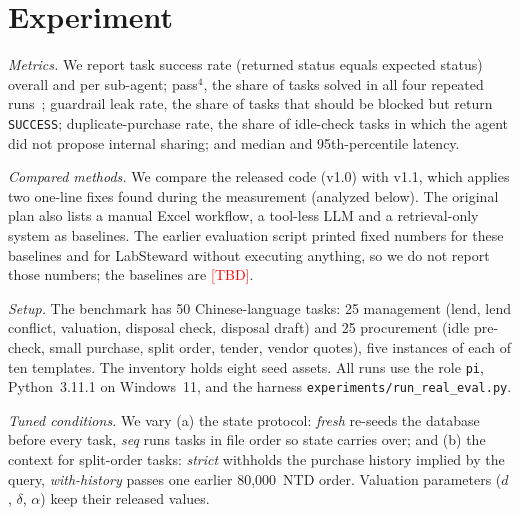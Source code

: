 \documentclass[conference]{IEEEtran}
\newcommand{\TBD}{\textcolor{red}{[TBD]}}
\begin{document}
\section{Experiment}
\textit{Metrics.} We report task success rate (returned status equals
expected status) overall and per sub-agent; pass$^4$, the share of tasks
solved in all four repeated runs~\cite{yao2024taubench}; guardrail leak
rate, the share of tasks that should be blocked but return
\texttt{SUCCESS}; duplicate-purchase rate, the share of idle-check tasks
in which the agent did not propose internal sharing; and median and
95th-percentile latency.

\textit{Compared methods.} We compare the released code (v1.0) with
v1.1, which applies two one-line fixes found during the measurement
(analyzed below). The original plan also lists a manual Excel workflow, a
tool-less LLM and a retrieval-only system as baselines. The earlier
evaluation script printed fixed numbers for these baselines and for
LabSteward without executing anything, so we do not report those numbers;
the baselines are \TBD.

\textit{Setup.} The benchmark has 50 Chinese-language tasks: 25 management
(lend, lend conflict, valuation, disposal check, disposal draft) and 25
procurement (idle pre-check, small purchase, split order, tender, vendor
quotes), five instances of each of ten templates. The inventory holds
eight seed assets. All runs use the role \texttt{pi}, Python~3.11.1 on
Windows~11, and the harness \texttt{experiments/run\_real\_eval.py}.

\textit{Tuned conditions.} We vary (a) the state protocol: \emph{fresh}
re-seeds the database before every task, \emph{seq} runs tasks in file
order so state carries over; and (b) the context for split-order tasks:
\emph{strict} withholds the purchase history implied by the query,
\emph{with-history} passes one earlier 80{,}000~NTD order. Valuation
parameters ($d$, $\delta$, $\alpha$) keep their released values.
\end{document}
